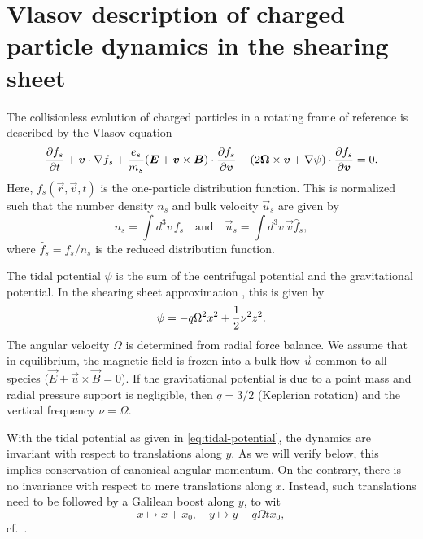 \documentclass[aps,pre,notitlepage,amsmath,amssymb,amsfonts,nobibnotes,nofootinbib,superscriptaddress]{revtex4-1}
\begin{document}
\section{Vlasov description of charged particle dynamics in the shearing
sheet}
\label{sec:vlasov-sheet}

The collisionless evolution of charged particles in a rotating frame of
reference is described by the Vlasov equation
\begin{equation}
  \label{eq:vlasov-sheet}
  \pder{f_s}{t} + \vec{v}\cdot\nabla f_s
  + \frac{\qs}{m_s}(\vec{E} + \vec{v}\times\vec{B})\cdot\pder{f_s}{\vec{v}}
  - (2\vec{\Omega}\times\vec{v} + \nabla\psi)\cdot\pder{f_s}{\vec{v}} = 0.
\end{equation}
Here, $f_s(\vec{r},\vec{v},t)$ is the one-particle distribution function. This
is normalized such that the number density $n_s$ and bulk velocity $\vec{u}_s$
are given by
\begin{equation}
  \label{eq:moments}
  n_s = \int d^3v\,f_s
  \quad\textrm{and}\quad
  \vec{u}_s = \int d^3v\,\vec{v}\hat{f}_s,
\end{equation}
where $\hat{f}_s=f_s/n_s$ is the reduced distribution function.

The tidal potential $\psi$ is the sum of the centrifugal potential and the
gravitational potential. In the shearing sheet approximation
\citep{Goldreich1965}, this is given by
\begin{equation}
  \label{eq:tidal-potential}
  \psi = -q\Omega^2 x^2 + \frac{1}{2}\vfreq^2 z^2.
\end{equation}
The angular velocity $\Omega$ is determined from radial force balance. We
assume that in equilibrium, the magnetic field is frozen into a bulk flow
$\vec{u}$ common to all species ($\vec{E}+\vec{u}\times\vec{B}=0$). If the
gravitational potential is due to a point mass and radial pressure support is
negligible, then $q=3/2$ (Keplerian rotation) and the vertical frequency
$\nu=\Omega$.

With the tidal potential as given in \cref{eq:tidal-potential}, the dynamics
are invariant with respect to translations along $y$. As we will verify below,
this implies conservation of canonical angular momentum. On the contrary,
there is no invariance with respect to mere translations along $x$. Instead,
such translations need to be followed by a Galilean boost along $y$, to wit
\begin{equation}
  \label{eq:shear-symmetry}
  x \mapsto x + x_0,\quad
  y \mapsto y - q\Omega t x_0,
\end{equation}
cf.~\citet{Wisdom1988}.
\end{document}
